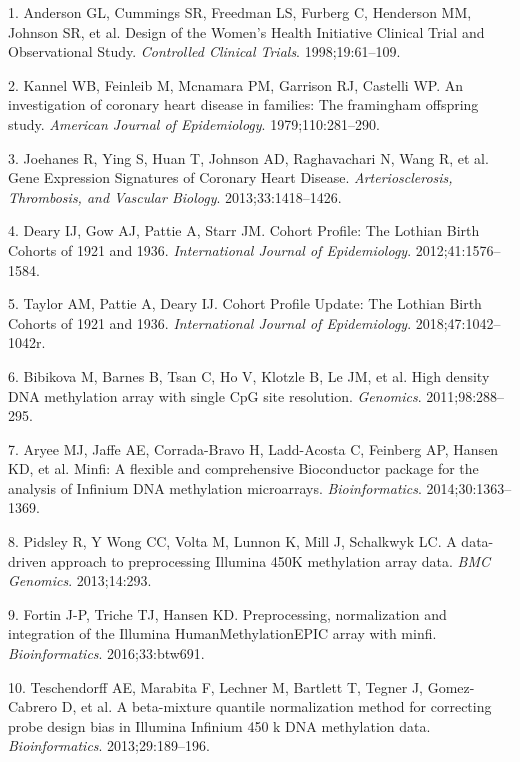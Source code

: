 \documentclass[]{article}
\begin{document}
\hypertarget{refs}{}
\leavevmode\hypertarget{ref-Anderson1998}{}%
1. Anderson GL, Cummings SR, Freedman LS, Furberg C, Henderson MM,
Johnson SR, et al. Design of the Women's Health Initiative Clinical
Trial and Observational Study. \emph{Controlled Clinical Trials}.
1998;19:61--109.

\leavevmode\hypertarget{ref-Kannel1979}{}%
2. Kannel WB, Feinleib M, Mcnamara PM, Garrison RJ, Castelli WP. An
investigation of coronary heart disease in families: The framingham
offspring study. \emph{American Journal of Epidemiology}.
1979;110:281--290.

\leavevmode\hypertarget{ref-Joehanes2013}{}%
3. Joehanes R, Ying S, Huan T, Johnson AD, Raghavachari N, Wang R, et
al. Gene Expression Signatures of Coronary Heart Disease.
\emph{Arteriosclerosis, Thrombosis, and Vascular Biology}.
2013;33:1418--1426.

\leavevmode\hypertarget{ref-Deary2012}{}%
4. Deary IJ, Gow AJ, Pattie A, Starr JM. Cohort Profile: The Lothian
Birth Cohorts of 1921 and 1936. \emph{International Journal of
Epidemiology}. 2012;41:1576--1584.

\leavevmode\hypertarget{ref-Taylor2018}{}%
5. Taylor AM, Pattie A, Deary IJ. Cohort Profile Update: The Lothian
Birth Cohorts of 1921 and 1936. \emph{International Journal of
Epidemiology}. 2018;47:1042--1042r.

\leavevmode\hypertarget{ref-Bibikova2011}{}%
6. Bibikova M, Barnes B, Tsan C, Ho V, Klotzle B, Le JM, et al. High
density DNA methylation array with single CpG site resolution.
\emph{Genomics}. 2011;98:288--295.

\leavevmode\hypertarget{ref-Aryee2014}{}%
7. Aryee MJ, Jaffe AE, Corrada-Bravo H, Ladd-Acosta C, Feinberg AP,
Hansen KD, et al. Minfi: A flexible and comprehensive Bioconductor
package for the analysis of Infinium DNA methylation microarrays.
\emph{Bioinformatics}. 2014;30:1363--1369.

\leavevmode\hypertarget{ref-Pidsley2013}{}%
8. Pidsley R, Y Wong CC, Volta M, Lunnon K, Mill J, Schalkwyk LC. A
data-driven approach to preprocessing Illumina 450K methylation array
data. \emph{BMC Genomics}. 2013;14:293.

\leavevmode\hypertarget{ref-Fortin2016}{}%
9. Fortin J-P, Triche TJ, Hansen KD. Preprocessing, normalization and
integration of the Illumina HumanMethylationEPIC array with minfi.
\emph{Bioinformatics}. 2016;33:btw691.

\leavevmode\hypertarget{ref-Teschendorff2013}{}%
10. Teschendorff AE, Marabita F, Lechner M, Bartlett T, Tegner J,
Gomez-Cabrero D, et al. A beta-mixture quantile normalization method for
correcting probe design bias in Illumina Infinium 450 k DNA methylation
data. \emph{Bioinformatics}. 2013;29:189--196.
\end{document}
